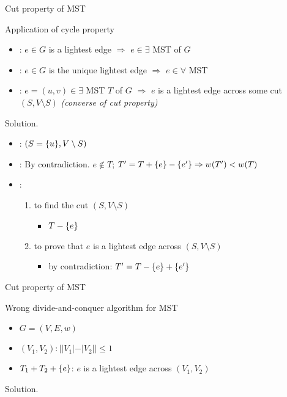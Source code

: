 \begin{frame}{Cut property of MST}
  \begin{exampleblock}{Application of cycle property }
    \begin{itemize}
      \item {}: $e \in G$ is a lightest edge $\Rightarrow$ $e \in \exists$ MST of $G$
      \item {}: $e \in G$ is the unique lightest edge $\Rightarrow$ $e \in \forall$ MST
      \item {}: $e = (u,v) \in \exists$ MST $T$ of $G$ $\Rightarrow$ $e$ is a lightest edge across some cut $(S, V \setminus S)$ \emph{(converse of cut property)}
    \end{itemize}
  \end{exampleblock}

  \begin{block}{Solution.}
    \begin{itemize}
      \item {}: $(S=\{u\}, V \setminus S)$
      \item {}: By contradiction. $e \notin T$; $T' = T + \{e\} - \{e'\} \Rightarrow w(T') < w(T)$
      \item {}: 
	\begin{enumerate}
	  \item to find the cut $(S, V \setminus S)$
	    \begin{itemize}
	      \item $T - \{e\}$
	    \end{itemize}
	  \item to prove that $e$ is a lightest edge across $(S, V \setminus S)$
	    \begin{itemize}
	      \item by contradiction: $T' = T - \{e\} + \{e'\}$
	    \end{itemize}
	\end{enumerate}
    \end{itemize}
  \end{block}
\end{frame}
\begin{frame}{Cut property of MST}
  \begin{exampleblock}{Wrong divide-and-conquer algorithm for MST }
    \begin{itemize}
      \item $G = (V, E, w)$
      \item $(V_{1}, V_{2}): ||V_{1}| - |V_{2}|| \le 1$
      \item $T_{1} + T_{2} + \{e\}$: $e$ is a lightest edge across $(V_{1}, V_{2})$
    \end{itemize}
  \end{exampleblock}

  \begin{block}{Solution.}
  \end{block}
\end{frame}
